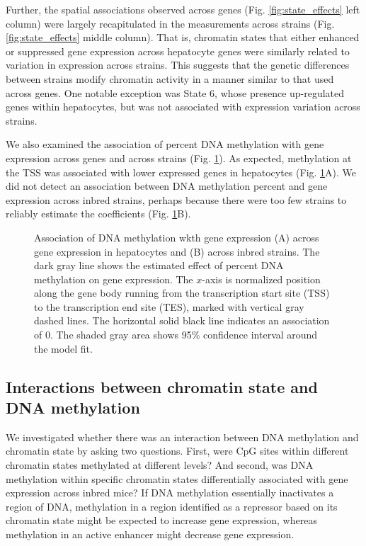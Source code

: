 \documentclass[
  11pt,
]{article}
\begin{document}
Further, the spatial associations observed across genes (Fig.
\ref{fig:state_effects} left column) were largely recapitulated in the
measurements across strains (Fig. \ref{fig:state_effects} middle
column). That is, chromatin states that either enhanced or suppressed
gene expression across hepatocyte genes were similarly related to
variation in expression across strains. This suggests that the genetic
differences between strains modify chromatin activity in a manner
similar to that used across genes. One notable exception was State 6,
whose presence up-regulated genes within hepatocytes, but was not
associated with expression variation across strains.

We also examined the association of percent DNA methylation with gene
expression across genes and across strains (Fig.
\ref{fig:DNA_methylation_effect}). As expected, methylation at the TSS
was associated with lower expressed genes in hepatocytes (Fig.
\ref{fig:DNA_methylation_effect}A). We did not detect an association
between DNA methylation percent and gene expression across inbred
strains, perhaps because there were too few strains to reliably estimate
the coefficients (Fig. \ref{fig:DNA_methylation_effect}B).

\begin{figure}[ht!]
\caption{Association of DNA methylation wkth gene expression (A) across 
gene expression in hepatocytes and (B) across inbred strains. The dark 
gray line shows the estimated effect of percent DNA methylation on gene 
expression. The $x$-axis is normalized position along the gene body 
running from the transcription start site (TSS) to the transcription 
end site (TES), marked with vertical gray dashed lines. The horizontal 
solid black line indicates an association of 0. The shaded gray area shows 
95\% confidence interval around the model fit.}
\label{fig:DNA_methylation_effect}
\end{figure}

\hypertarget{interactions-between-chromatin-state-and-dna-methylation}{%
\subsection{Interactions between chromatin state and DNA
methylation}\label{interactions-between-chromatin-state-and-dna-methylation}}

We investigated whether there was an interaction between DNA methylation
and chromatin state by asking two questions. First, were CpG sites
within different chromatin states methylated at different levels? And
second, was DNA methylation within specific chromatin states
differentially associated with gene expression across inbred mice? If
DNA methylation essentially inactivates a region of DNA, methylation in
a region identified as a repressor based on its chromatin state might be
expected to increase gene expression, whereas methylation in an active
enhancer might decrease gene expression.
\end{document}
